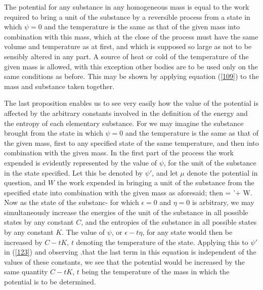 \documentclass[12pt]{article}
\begin{document}
The potential for any substance in any homogeneous mass is equal to the work required to bring a unit of the substance by a reversible process from a state in which $\psi =0$ and the temperature is the same as that of the given mass into combination with this mass, which at the close of the process must have the same volume and temperature as at first, and which is supposed so large as not to be sensibly altered in any part. A source of heat or cold of the temperature of the given mass is allowed, with this exception other bodies are to be used only on the same conditions as before. This may be shown by applying equation (\ref{109}) to the mass and substance taken together.


The last proposition enables us to see very easily how the value of the potential is affected by the arbitrary constants involved in the definition of the energy and the entropy of each elementary substance. For we may imagine the substance brought from the state in which $\psi =0$ and the temperature is the same as that of the given mass, first to any specified state of the same temperature, and then into combination with the given mass. In the first part of the process the work expended is evidently represented by the value of $\psi$, for the unit of the substance in the state specified. Let this be denoted by $\psi'$, and let $\mu$ denote the potential in question, and $W$ the work expended in bringing a unit of the substance from the specified state into combination with the given mass as aforesaid; then
\eqs \mu = \psi'+ W. \label{123}\eqe
Now as the state of the substanc- for which $\epsilon =0$ and $\eta = 0$ is arbitrary, we may simultaneously increase the energies of the unit of the substance in all possible states by any constant $C$, and the entropies of the substance in all possible states by any constant $K$. The value of $\psi$, or $\epsilon-t\eta$, for any state would then be increased by $C-tK$, $t$ denoting the temperature of the state. Applying this to $\psi'$ in (\ref{123}) and observing .that the last term in this equation is independent of the values of these constants, we see that the potential would be increased by the same quantity $C-tK$, $t$ being the temperature of the mass in which the potential is to be determined.

\end{document}
